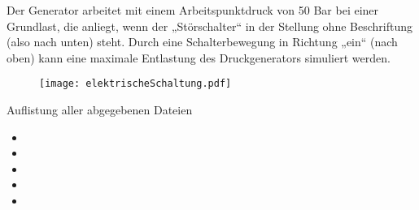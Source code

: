 \documentclass[11pt, a4paper,parskip=half]{report}
\begin{document}
Der Generator arbeitet mit einem Arbeitspunktdruck von 50 Bar bei einer Grundlast, die anliegt, wenn der „Störschalter“ in der Stellung ohne Beschriftung (also nach unten) steht. Durch eine Schalterbewegung in Richtung „ein“ (nach oben) kann eine maximale Entlastung des Druckgenerators simuliert werden.


\begin{figure}[htbp]
	\begin{center}
		\texttt{[image: elektrischeSchaltung.pdf]} 
	\end{center} 
\end{figure}


\newpage
\begin{huge}
Auflistung aller abgegebenen Dateien\\

\end{huge}

\begin{itemize}
\item
\item
\item
\item
\item
\end{itemize}




\tableofcontents %



\listoffigures		%
\begin{appendix}
  
\end{appendix}

\clearpage\newpage
{}


\end{document}
